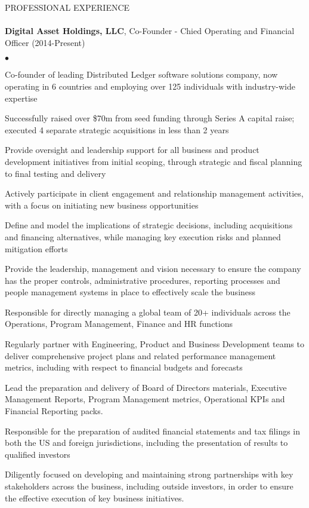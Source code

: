 \documentclass[12pt]{article}
\newcommand{\lineunder}{\vspace*{-9pt} \\ \hspace*{-18pt} \hrulefill \\}
\newcommand{\header}[1]{{\hspace*{-15pt}\vspace*{6pt} \textsc{#1}} \vspace*{-9pt} \lineunder}
\newcommand{\employer}[2]{{ #1 (#2) }}
\newenvironment{achievements}{\begin{list}{$\bullet$}{\topsep 0pt \itemsep -2pt}}{\vspace*{4pt}\end{list}}
\begin{document}
\header{PROFESSIONAL EXPERIENCE}
  \employer{\textbf{Digital Asset Holdings, LLC}, Co-Founder - Chied Operating and Financial Officer}{2014-Present}
    \begin{achievements}
      \item Co-founder of leading Distributed Ledger software solutions company,
            now operating in 6 countries and employing over 125 individuals with industry-wide expertise
      \item Successfully raised over \$70m from seed funding through Series A
            capital raise; executed 4 separate strategic acquisitions in less than 2 years
      \item Provide oversight and leadership support for all business and product
            development initiatives from initial scoping, through strategic and fiscal planning to final testing and delivery
      \item Actively participate in client engagement and relationship management
            activities, with a focus on initiating new business opportunities
      \item Define and model the implications of strategic decisions, including
            acquisitions and financing alternatives, while managing key execution risks and planned mitigation efforts
      \item Provide the leadership, management and vision necessary to ensure
            the company has the proper controls, administrative procedures,
            reporting processes and people management systems in place to
            effectively scale the business
      \item Responsible for directly managing a global team of 20+ individuals
            across the Operations, Program Management, Finance and HR functions
      \item Regularly partner with Engineering, Product and Business Development
            teams to deliver comprehensive project plans and related performance
            management metrics, including with respect to financial budgets and forecasts
      \item Lead the preparation and delivery of Board of Directors materials,
            Executive Management Reports, Program Management metrics, Operational
            KPIs and Financial Reporting packs.
      \item Responsible for the preparation of audited financial statements and
            tax filings in both the US and foreign jurisdictions, including the
            presentation of results to qualified investors
      \item Diligently focused on developing and maintaining strong partnerships
            with key stakeholders across the business, including outside investors,
            in order to ensure the effective execution of key business initiatives.
    \end{achievements}
\end{document}
